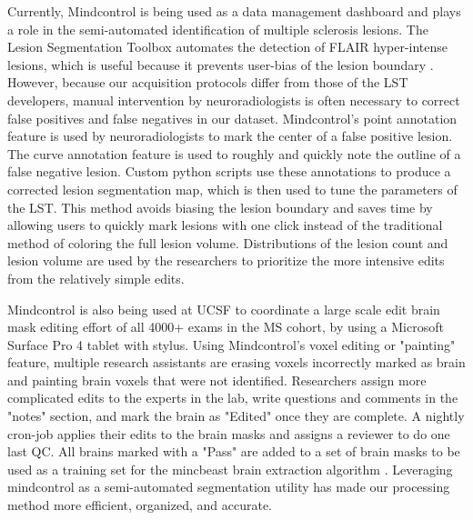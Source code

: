 Currently, Mindcontrol is being used as a data management dashboard and plays a role in the semi-automated identification of multiple sclerosis lesions. The Lesion Segmentation Toolbox automates the detection of FLAIR hyper-intense lesions, which is useful because it prevents user-bias of the lesion boundary \cite{Schmidt_2012}. However, because our acquisition protocols differ from those of the LST developers, manual intervention by neuroradiologists is often necessary to correct false positives and false negatives in our dataset. Mindcontrol's point annotation feature is used by neuroradiologists to mark the center of a false positive lesion. The curve annotation feature is used to roughly and quickly note the outline of a false negative lesion. Custom python scripts use these annotations to produce a corrected lesion segmentation map, which is then used to tune the parameters of the LST. This method avoids biasing the lesion boundary and saves time by allowing users to quickly mark lesions with one click instead of the traditional method of coloring the full lesion volume. Distributions of the lesion count and lesion volume are used by the researchers to prioritize the more intensive edits from the relatively simple edits.

Mindcontrol is also being used at UCSF to coordinate a large scale edit brain mask editing effort of all 4000+ exams in the MS cohort, by using a Microsoft Surface Pro 4 tablet with stylus. Using Mindcontrol's voxel editing or "painting" feature, multiple research assistants are erasing voxels incorrectly marked as brain and painting brain voxels that were not identified. Researchers assign more complicated edits to the experts in the lab, write questions and comments in the "notes" section, and mark the brain as "Edited" once they are complete. A nightly cron-job applies their edits to the brain masks and assigns a reviewer to do one last QC. All brains marked with a "Pass" are added to a set of brain masks to be  used as a training set for the mincbeast brain extraction algorithm \cite{eskildsen2012beast}. Leveraging mindcontrol as a semi-automated segmentation utility has made our processing method more efficient, organized, and accurate.





